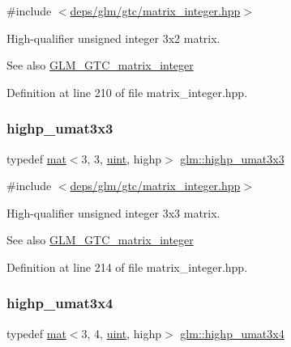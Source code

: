 {\ttfamily \#include $<$\hyperlink{matrix__integer_8hpp}{deps/glm/gtc/matrix\+\_\+integer.\+hpp}$>$}

High-\/qualifier unsigned integer 3x2 matrix. \begin{DoxySeeAlso}{See also}
\hyperlink{group__gtc__matrix__integer}{G\+L\+M\+\_\+\+G\+T\+C\+\_\+matrix\+\_\+integer} 
\end{DoxySeeAlso}


Definition at line 210 of file matrix\+\_\+integer.\+hpp.

\mbox{\label{group__gtc__matrix__integer_gaa389f5f7427d2578424ddc12ce120af3}} 
\subsubsection{\texorpdfstring{highp\+\_\+umat3x3}{highp\_umat3x3}}
{\footnotesize\ttfamily typedef \hyperlink{structglm_1_1mat}{mat}$<$3, 3, \hyperlink{group__core__precision_ga4fd29415871152bfb5abd588334147c8}{uint}, highp$>$ \hyperlink{group__gtc__matrix__integer_gaa389f5f7427d2578424ddc12ce120af3}{glm\+::highp\+\_\+umat3x3}}



{\ttfamily \#include $<$\hyperlink{matrix__integer_8hpp}{deps/glm/gtc/matrix\+\_\+integer.\+hpp}$>$}

High-\/qualifier unsigned integer 3x3 matrix. \begin{DoxySeeAlso}{See also}
\hyperlink{group__gtc__matrix__integer}{G\+L\+M\+\_\+\+G\+T\+C\+\_\+matrix\+\_\+integer} 
\end{DoxySeeAlso}


Definition at line 214 of file matrix\+\_\+integer.\+hpp.

\mbox{\label{group__gtc__matrix__integer_ga6df8a72a571bcd26ade637bf069b5562}} 
\subsubsection{\texorpdfstring{highp\+\_\+umat3x4}{highp\_umat3x4}}
{\footnotesize\ttfamily typedef \hyperlink{structglm_1_1mat}{mat}$<$3, 4, \hyperlink{group__core__precision_ga4fd29415871152bfb5abd588334147c8}{uint}, highp$>$ \hyperlink{group__gtc__matrix__integer_ga6df8a72a571bcd26ade637bf069b5562}{glm\+::highp\+\_\+umat3x4}}



